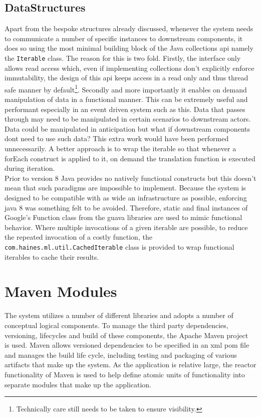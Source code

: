 \documentclass[a4paper,11pt]{scrreprt}
\begin{document}
\subsection{DataStructures}
Apart from the bespoke structures already discussed, whenever the system needs to communicate a number of specific instances to downstream components, it does so using the most minimal building block of the Java collections \acrshort{api} namely the \verb|Iterable| class. The reason for this is two fold. Firstly, the interface only allows read access which, even if implementing collections don't explicitly enforce immutability, the design of this \acrshort{api} keeps access in a read only and thus thread safe manner by default\footnote{Technically care still needs to be taken to ensure visibility.}. Secondly and more importantly it enables on demand manipulation of data in a functional manner. This can be extremely useful and performant especially in an event driven system such as this. Data that passes through may need to be manipulated in certain scenarios to downstream actors. Data could be manipulated in anticipation but what if downstream components dont need to use such data? This extra work would have been performed unnecessarily. A better approach is to wrap the iterable so that whenever a forEach construct is applied to it, on demand the translation function is executed during iteration. \\
Prior to version 8 Java provides no natively functional constructs but this doesn't mean that such paradigms are impossible to implement. Because the system is designed to be compatible with as wide an infrastructure as possible, enforcing java 8 was something felt to be avoided. Therefore, static and final instances of Google's Function class from the guava libraries are used to mimic functional behavior. Where multiple invocations of a given iterable are possible, to reduce the repeated invocation of a costly function, the \verb|com.haines.ml.util.CachedIterable| class is provided to wrap functional iterables to cache their results.

\section{Maven Modules}
The system utilizes a number of different libraries and adopts a number of conceptual logical components. To manage the third party dependencies, versioning, lifecycles and build of these components, the Apache Maven project~\cite{maven} is used. Maven allows versioned dependencies to be specified in an \acrshort{xml} pom file and manages the build life cycle, including testing and packaging of various artifacts that make up the system. As the application is relative large, the reactor functionality of Maven is used to help define atomic units of functionality into separate modules that make up the application. 
\end{document}
